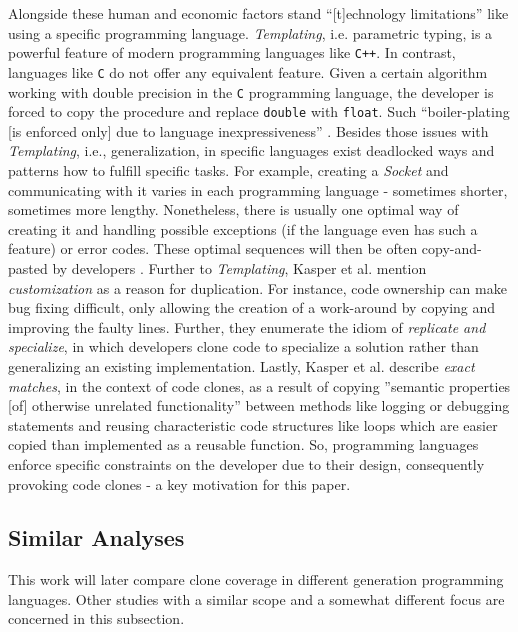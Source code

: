 Alongside these human and economic factors stand ``[t]echnology limitations'' \cite{kasper2006cloning} like using a specific programming language.
\textit{Templating}, i.e. parametric typing, is a powerful feature of modern programming languages like \texttt{C++}. In contrast, languages like \texttt{C} do not offer any equivalent feature.
Given a certain algorithm working with double precision in the \texttt{C} programming language, the developer is forced to copy the procedure and replace \texttt{double} with \texttt{float}. Such ``boiler-plating [is enforced only] due to language inexpressiveness'' \cite{kasper2006cloning}. 
Besides those issues with \textit{Templating}, i.e., generalization, in specific languages exist deadlocked ways and patterns how to fulfill specific tasks.
For example, creating a \textit{Socket} and communicating with it varies in each programming language - sometimes shorter, sometimes more lengthy. Nonetheless, there is usually one optimal way of creating it and handling possible exceptions (if the language even has such a feature) or error codes. 
These optimal sequences will then be often copy-and-pasted by developers \cite{kasper2006cloning}.
Further to \textit{Templating}, Kasper et al.  \cite{kasper2006cloning} mention \textit{customization} as a reason for duplication.
For instance, code ownership can make bug fixing difficult, only allowing the creation of a work-around by copying and improving the faulty lines.
Further, they enumerate the idiom of \textit{replicate and specialize}, in which developers clone code to specialize a solution rather than generalizing an existing implementation.
Lastly, Kasper et al. \cite{kasper2006cloning} describe \textit{exact matches}, in the context of code clones, as a result of copying ”semantic properties [of] otherwise unrelated functionality” \cite{kasper2006cloning} between methods like logging or debugging statements and reusing characteristic code structures like loops which are easier copied than implemented as a reusable function.
So, programming languages enforce specific constraints on the developer due to their design, consequently provoking code clones - a key motivation for this paper.

\subsection{Similar Analyses}
\label{sec:similiar_analyses}

This work will later compare clone coverage in different generation programming languages. Other studies with a similar scope and a somewhat different focus are concerned in this subsection.

